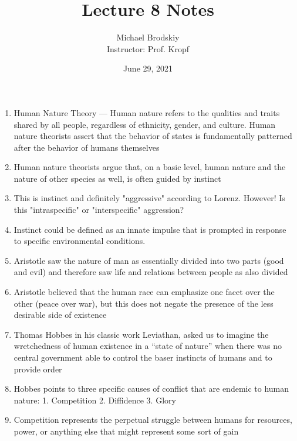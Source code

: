 \documentclass[12pt]{article}
\title{Lecture 8 Notes}
\date{June 29, 2021}
\author{Michael Brodskiy\\ \small Instructor: Prof. Kropf}
\begin{document}
    \maketitle

    \begin{enumerate}

      \item Human Nature Theory — Human nature refers to the qualities and traits shared by all people, regardless of ethnicity, gender, and culture. Human nature theorists assert that the behavior of states is fundamentally patterned after the behavior of humans themselves

      \item Human nature theorists argue that, on a basic level, human nature and the nature of other species as well, is often guided by instinct

      \item This is instinct and definitely "aggressive" according to Lorenz. However! Is this "intraspecific" or "interspecific" aggression? 

      \item Instinct could be defined as an innate impulse that is prompted in response to specific environmental conditions.

      \item Aristotle saw the nature of man as essentially divided into two parts (good and evil) and therefore saw life and relations between people as also divided

      \item Aristotle believed that the human race can emphasize one facet over the other (peace over war), but this does not negate the presence of the less desirable side of existence

      \item Thomas Hobbes in his classic work Leviathan, asked us to imagine the wretchedness of human existence in a “state of nature” when there was no central government able to control the baser instincts of humans and to provide order

      \item Hobbes points to three specific causes of conflict that are endemic to human nature: 1. Competition 2. Diffidence 3. Glory 

      \item Competition represents the perpetual struggle between humans for resources, power, or anything else that might represent some sort of gain


\end{enumerate}
\end{document}
